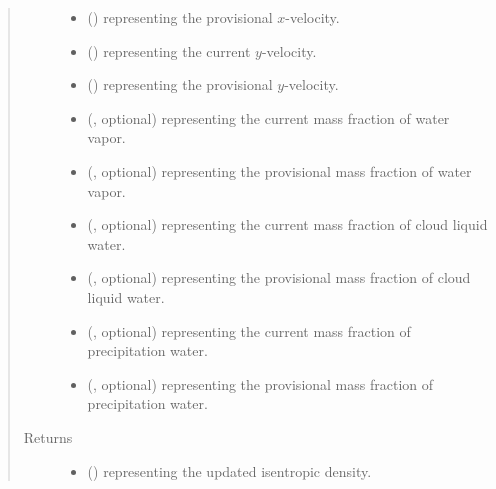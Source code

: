 \documentclass[letterpaper,10pt,english]{sphinxmanual}
\begin{document}
\begin{fulllineitems}
\begin{fulllineitems}
\begin{quote}
\begin{description}
\begin{itemize}
\item {} 
 () \textendash{}  representing the provisional \(x\)-velocity.

\item {} 
 () \textendash{}  representing the current \(y\)-velocity.

\item {} 
 () \textendash{}  representing the provisional \(y\)-velocity.

\item {} 
 (, optional) \textendash{}  representing the current mass fraction of water vapor.

\item {} 
 (, optional) \textendash{}  representing the provisional mass fraction of water vapor.

\item {} 
 (, optional) \textendash{}  representing the current mass fraction of cloud liquid water.

\item {} 
 (, optional) \textendash{}  representing the provisional mass fraction of cloud liquid water.

\item {} 
 (, optional) \textendash{}  representing the current mass fraction of precipitation water.

\item {} 
 (, optional) \textendash{}  representing the provisional mass fraction of precipitation water.

\end{itemize}

\item[{Returns}] \leavevmode
\begin{itemize}
\item {} 
 () \textendash{}  representing the updated isentropic density.


\end{itemize}
\end{description}
\end{quote}
\end{fulllineitems}
\end{fulllineitems}
\end{document}
